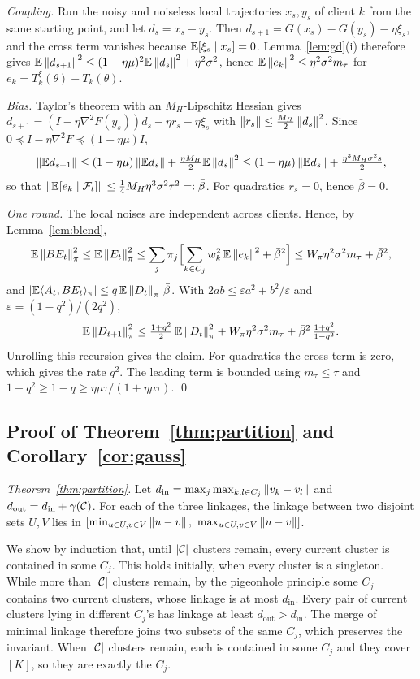 \emph{Coupling.} Run the noisy and noiseless local trajectories $x_s,y_s$ of client $k$ from
the same starting point, and let $d_s=x_s-y_s$. Then $d_{s+1}=G(x_s)-G(y_s)-\eta\xi_s$, and
the cross term vanishes because $\mathbb{E}[\xi_s\mid x_s]=0$. Lemma~\ref{lem:gd}(i) therefore gives
$\mathbb{E}\left\lVert d_{s+1} \right\rVert^2\le(1-\eta\mu)^2\mathbb{E}\left\lVert d_s \right\rVert^2+\eta^2\sigma^2$, hence
$\mathbb{E}\left\lVert e_k \right\rVert^2\le\eta^2\sigma^2m_\tau$ for $e_k=T_k^\xi(\theta)-T_k(\theta)$.

\emph{Bias.} Taylor's theorem with an $M_H$-Lipschitz Hessian gives
$d_{s+1}=(I-\eta\nabla^2F(y_s))d_s-\eta r_s-\eta\xi_s$ with
$\left\lVert r_s \right\rVert\le\frac{M_H}{2}\left\lVert d_s \right\rVert^2$. Since $0\preceq I-\eta\nabla^2F\preceq(1-\eta\mu)I$,
\[
  \left\lVert \mathbb{E} d_{s+1} \right\rVert\le(1-\eta\mu)\left\lVert \mathbb{E} d_s \right\rVert+\tfrac{\eta M_H}{2}\mathbb{E}\left\lVert d_s \right\rVert^2\le(1-\eta\mu)\left\lVert \mathbb{E} d_s \right\rVert+\tfrac{\eta^3M_H\sigma^2s}{2},
\]
so that $\left\lVert \mathbb{E}[e_k\mid\mathcal F_t] \right\rVert\le\frac14M_H\eta^3\sigma^2\tau^2=:\bar\beta$. For
quadratics $r_s=0$, hence $\bar\beta=0$.

\emph{One round.} The local noises are independent across clients. Hence, by
Lemma~\ref{lem:blend},
\[
  \mathbb{E}\left\lVert BE_t \right\rVert_{\pi}^2\le\mathbb{E}\left\lVert E_t \right\rVert_{\pi}^2\le\sum_j\pi_j\Bigl[\sum_{k\in C_j}w_k^2\,\mathbb{E}\left\lVert e_k \right\rVert^2+\bar\beta^2\Bigr]\le W_\pi\eta^2\sigma^2m_\tau+\bar\beta^2,
\]
and $|\mathbb{E}\langle A_t,BE_t\rangle_\pi|\le q\,\mathbb{E}\left\lVert D_t \right\rVert_{\pi}\,\bar\beta$. With
$2ab\le\varepsilon a^2+b^2/\varepsilon$ and $\varepsilon=(1-q^2)/(2q^2)$,
\[
  \mathbb{E}\left\lVert D_{t+1} \right\rVert_{\pi}^2\le\tfrac{1+q^2}{2}\,\mathbb{E}\left\lVert D_t \right\rVert_{\pi}^2+W_\pi\eta^2\sigma^2m_\tau+\bar\beta^2\,\tfrac{1+q^2}{1-q^2}.
\]
Unrolling this recursion gives the claim. For quadratics the cross term is zero, which gives
the rate $q^2$. The leading term is bounded using
$m_\tau\le\tau$ and $1-q^2\ge1-q\ge\eta\mu\tau/(1+\eta\mu\tau)$.
\qed

\subsection{Proof of Theorem~\ref{thm:partition} and Corollary~\ref{cor:gauss}}
\label{app:proof_partition}
\emph{Theorem~\ref{thm:partition}.} Let
$d_{\mathrm{in}}=\max_j\max_{k,l\in C_j}\left\lVert v_k-v_l \right\rVert$ and
$d_{\mathrm{out}}=d_{\mathrm{in}}+\gamma(\mathcal{C})$. For each of the three linkages, the linkage
between two disjoint sets $U,V$ lies in
$[\min_{u\in U,v\in V}\norm{u-v},\ \max_{u\in U,v\in V}\norm{u-v}]$.

We show by induction that, until $|\mathcal{C}|$ clusters remain, every current cluster is
contained in some $C_j$. This holds initially, when every cluster is a singleton. While more
than $|\mathcal{C}|$ clusters remain, by the pigeonhole principle some $C_j$ contains two current
clusters, whose linkage is at most $d_{\mathrm{in}}$. Every pair of current clusters lying
in different $C_j$'s has linkage at least $d_{\mathrm{out}}>d_{\mathrm{in}}$. The merge of
minimal linkage therefore joins two subsets of the same $C_j$, which preserves the
invariant. When $|\mathcal{C}|$ clusters remain, each is contained in some $C_j$ and they cover
$[K]$, so they are exactly the $C_j$.

